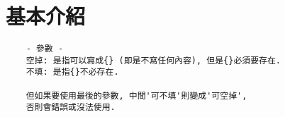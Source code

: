 \section{基本介紹}

  \begin{framed}
  \begin{verbatim}
    - 參數 -
    空掉: 是指可以寫成{} (即是不寫任何內容), 但是{}必須要存在.
    不填: 是指{}不必存在.

    但如果要使用最後的參數, 中間'可不填'則變成'可空掉',
    否則會錯誤或沒法使用.
  \end{verbatim}
  \end{framed}


\EndChapter
